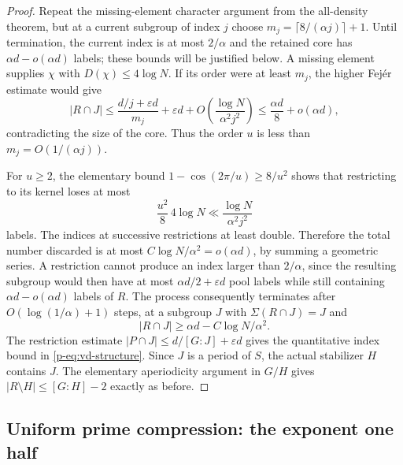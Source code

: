 \documentclass[11pt,a4paper]{article}
\theoremstyle{definition}
\theoremstyle{remark}
\begin{document}
\begin{proof}
Repeat the missing-element character argument from the all-density
theorem, but at a current subgroup of index $j$ choose
$m_j=\lceil8/(\alpha j)\rceil+1$. Until termination, the current
index is at most $2/\alpha$ and the retained core has
$\alpha d-o(\alpha d)$ labels; these bounds will be justified below.
A missing element supplies $\chi$ with $D(\chi)\leq4\log N$.
If its order were at least $m_j$, the higher Fej\'er estimate would give
\[
 |R\cap J|
 \leq \frac{d/j+\varepsilon d}{m_j}+\varepsilon d
       +O\left(\frac{\log N}{\alpha^2j^2}\right)
 \leq\frac{\alpha d}{8}+o(\alpha d),
\]
contradicting the size of the core. Thus the order $u$ is less than
$m_j=O(1/(\alpha j))$.

For $u\geq2$, the elementary bound
$1-\cos(2\pi/u)\geq8/u^2$ shows that restricting to its kernel loses
at most
\[
 \frac{u^2}{8}\,4\log N
 \ll\frac{\log N}{\alpha^2j^2}
\]
labels. The indices at successive restrictions at least double.
Therefore the total number discarded is at most
$C\log N/\alpha^2=o(\alpha d)$, by summing a geometric series.
A restriction cannot produce an index larger than $2/\alpha$, since
the resulting subgroup would then have at most
$\alpha d/2+\varepsilon d$ pool labels while still containing
$\alpha d-o(\alpha d)$ labels of $R$.
The process consequently terminates after $O(\log(1/\alpha)+1)$ steps,
at a subgroup $J$ with $\Sigma(R\cap J)=J$ and
\[
 |R\cap J|\geq\alpha d-C\log N/\alpha^2.
\]
The restriction estimate $|P\cap J|\leq d/[G:J]+\varepsilon d$
gives the quantitative index bound in \eqref{p-eq:vd-structure}.
Since $J$ is a period of $S$, the actual stabilizer $H$ contains $J$.
The elementary aperiodicity argument in $G/H$ gives
$|R\setminus H|\leq[G:H]-2$ exactly as before.
\end{proof}

\subsection{Uniform prime compression: the exponent one half}
\end{document}
